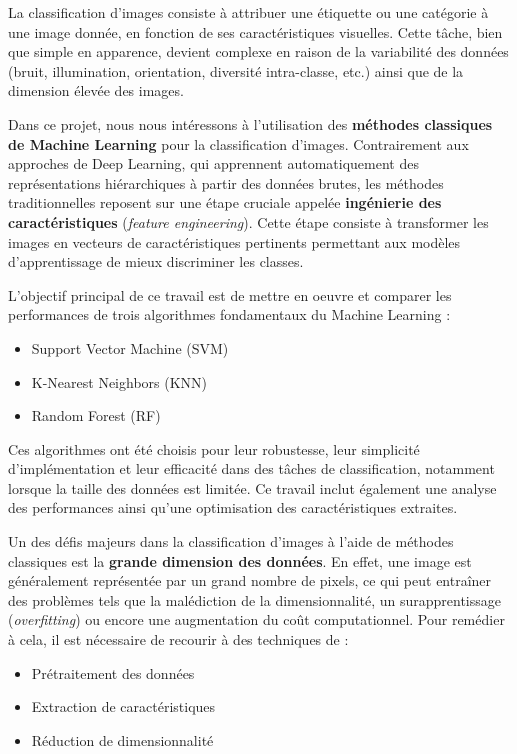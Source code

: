 \documentclass[12pt,a4paper]{article}
\begin{document}
    La classification d’images consiste à attribuer une étiquette ou une catégorie à une image donnée, en fonction de ses caractéristiques visuelles.
    Cette tâche, bien que simple en apparence, devient complexe en raison de la variabilité des données (bruit, illumination, orientation, diversité intra-classe, etc.) ainsi que de la dimension élevée des images.

    Dans ce projet, nous nous intéressons à l’utilisation des \textbf{méthodes classiques de Machine Learning} pour la classification d’images.
    Contrairement aux approches de Deep Learning, qui apprennent automatiquement des représentations hiérarchiques à partir des données brutes, les méthodes traditionnelles reposent sur une étape cruciale appelée \textbf{ingénierie des caractéristiques} (\textit{feature engineering}).
    Cette étape consiste à transformer les images en vecteurs de caractéristiques pertinents permettant aux modèles d’apprentissage de mieux discriminer les classes.

    L’objectif principal de ce travail est de mettre en oeuvre et comparer les performances de trois algorithmes fondamentaux du Machine Learning :
    \begin{itemize}
        \item Support Vector Machine (SVM)
        \item K-Nearest Neighbors (KNN)
        \item Random Forest (RF)
    \end{itemize}

    Ces algorithmes ont été choisis pour leur robustesse, leur simplicité d’implémentation et leur efficacité dans des tâches de classification, notamment lorsque la taille des données est limitée.
    Ce travail inclut également une analyse des performances ainsi qu’une optimisation des caractéristiques extraites.

    Un des défis majeurs dans la classification d’images à l’aide de méthodes classiques est la \textbf{grande dimension des données}.
    En effet, une image est généralement représentée par un grand nombre de pixels, ce qui peut entraîner des problèmes tels que la malédiction de la dimensionnalité, un surapprentissage (\textit{overfitting}) ou encore une augmentation du coût computationnel.
    Pour remédier à cela, il est nécessaire de recourir à des techniques de :
    \begin{itemize}
        \item Prétraitement des données
        \item Extraction de caractéristiques
        \item Réduction de dimensionnalité
    \end{itemize}
\end{document}
